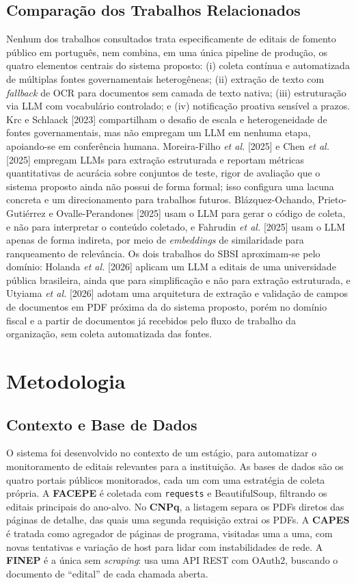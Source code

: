 \documentclass[12pt]{article}
\begin{document}
  \subsection{Comparação dos Trabalhos Relacionados}
  Nenhum dos trabalhos consultados trata especificamente de editais de fomento público em português, nem combina, em uma única pipeline de produção, os quatro elementos centrais do sistema proposto: (i) coleta contínua e automatizada de múltiplas fontes governamentais heterogêneas; (ii) extração de texto com \emph{fallback} de OCR para documentos sem camada de texto nativa; (iii) estruturação via LLM com vocabulário controlado; e (iv) notificação proativa sensível a prazos. Krc e Schlaack [2023] compartilham o desafio de escala e heterogeneidade de fontes governamentais, mas não empregam um LLM em nenhuma etapa, apoiando-se em conferência humana. Moreira-Filho \emph{et al.} [2025] e Chen \emph{et al.} [2025] empregam LLMs para extração estruturada e reportam métricas quantitativas de acurácia sobre conjuntos de teste, rigor de avaliação que o sistema proposto ainda não possui de forma formal; isso configura uma lacuna concreta e um direcionamento para trabalhos futuros. Blázquez-Ochando, Prieto-Gutiérrez e Ovalle-Perandones [2025] usam o LLM para gerar o código de coleta, e não para interpretar o conteúdo coletado, e Fahrudin \emph{et al.} [2025] usam o LLM apenas de forma indireta, por meio de \emph{embeddings} de similaridade para ranqueamento de relevância. Os dois trabalhos do SBSI aproximam-se pelo domínio: Holanda \emph{et al.} [2026] aplicam um LLM a editais de uma universidade pública brasileira, ainda que para simplificação e não para extração estruturada, e Utyiama \emph{et al.} [2026] adotam uma arquitetura de extração e validação de campos de documentos em PDF próxima da do sistema proposto, porém no domínio fiscal e a partir de documentos já recebidos pelo fluxo de trabalho da organização, sem coleta automatizada das fontes.

  

  \section{Metodologia}\label{sec:metodologia}

  \subsection{Contexto e Base de Dados}\label{sec:base-de-dados}
  O sistema foi desenvolvido no contexto de um estágio, para automatizar o monitoramento de editais relevantes para a instituição. As bases de dados são os quatro portais públicos monitorados, cada um com uma estratégia de coleta própria. A \textbf{FACEPE} é coletada com \texttt{requests} e BeautifulSoup, filtrando os editais principais do ano-alvo. No \textbf{CNPq}, a listagem separa os PDFs diretos das páginas de detalhe, das quais uma segunda requisição extrai os PDFs. A \textbf{CAPES} é tratada como agregador de páginas de programa, visitadas uma a uma, com novas tentativas e variação de host para lidar com instabilidades de rede. A \textbf{FINEP} é a única sem \emph{scraping}: usa uma API REST com OAuth2, buscando o documento de ``edital'' de cada chamada aberta.
\end{document}
